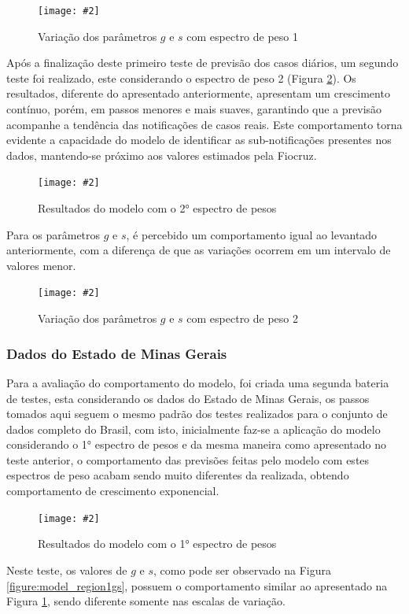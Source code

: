 \documentclass[a4paper,12pt]{article}
\newcommand{\image}[4]{
    \begin{figure}[H]%
        \begin{center}
        \caption{#3}
        \texttt{[image: \#2]}
        \label{#4}
        \end{center}
    \end{figure}
}
\begin{document}
\image{0.75}{images/modelo/pais/gs_modelo_Brasil_1.png}{Variação dos parâmetros $g$ e $s$ com espectro de peso 1}{figure:model_country1gs}

\par Após a finalização deste primeiro teste de previsão dos casos diários, um segundo teste foi realizado, este considerando o espectro de peso 2 (Figura \ref{figure:model_country2}). Os resultados, diferente do apresentado anteriormente, apresentam um crescimento contínuo, porém, em passos menores e mais suaves, garantindo que a previsão acompanhe a tendência das notificações de casos reais. Este comportamento torna evidente a capacidade do modelo de identificar as sub-notificações presentes nos dados, mantendo-se próximo aos valores estimados pela Fiocruz.

\image{0.85}{images/modelo/pais/estimativa_Brasil_2.png}{Resultados do modelo com o 2° espectro de pesos}{figure:model_country2}

\par Para os parâmetros $g$ e $s$, é percebido um comportamento igual ao levantado anteriormente, com a diferença de que as variações ocorrem em um intervalo de valores menor.

\image{0.75}{images/modelo/pais/gs_modelo_Brasil_2.png}{Variação dos parâmetros $g$ e $s$ com espectro de peso 2}{figure:model_country2gs}

\subsubsection{Dados do Estado de Minas Gerais}

\par Para a avaliação do comportamento do modelo, foi criada uma segunda bateria de testes, esta considerando os dados do Estado de Minas Gerais, os passos tomados aqui seguem o mesmo padrão dos testes realizados para o conjunto de dados completo do Brasil, com isto, inicialmente faz-se a aplicação do modelo considerando o 1° espectro de pesos e da mesma maneira como apresentado no teste anterior, o comportamento das previsões feitas pelo modelo com estes espectros de peso acabam sendo muito diferentes da realizada, obtendo comportamento de crescimento exponencial.

\image{0.85}{images/modelo/regiao/estimativa_MG_1.png}{Resultados do modelo com o 1° espectro de pesos}{figure:model_region1}

\par Neste teste, os valores de $g$ e $s$, como pode ser observado na Figura \ref{figure:model_region1gs}, possuem o comportamento similar ao apresentado na Figura \ref{figure:model_country1gs}, sendo diferente somente nas escalas de variação. 
\end{document}
